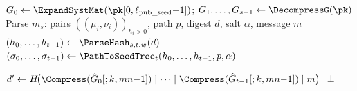 \begin{algorithm}[htbp]
\small
\setlength{\algomargin}{1.2em}
\caption{MEDS verification (simplified)}
\label{alg:verify_meds}

$G_0 \leftarrow \ExpandSystMat(\pk[0,\ell_{\mathrm{pub\_seed}}{-}1])$;\quad
$G_1,\ldots,G_{s-1} \leftarrow \DecompressG(\pk)$\;
Parse $m_s$: pairs $((\mu_i,\nu_i))_{h_i>0}$, path $p$, digest $d$, salt $\alpha$, message $m$\;
$(h_0,\ldots,h_{t-1}) \leftarrow \ParseHash_{s,t,w}(d)$\;
$(\sigma_0,\ldots,\sigma_{t-1}) \leftarrow \PathToSeedTree_t(h_0,\ldots,h_{t-1},p,\alpha)$\;


$d' \leftarrow H\!\bigl(\Compress(\hat{G}_0[;k,mn{-}1]) \mid \cdots \mid \Compress(\hat{G}_{t-1}[;k,mn{-}1]) \mid m\bigr)$\;
\Return $\perp$
\end{algorithm}
